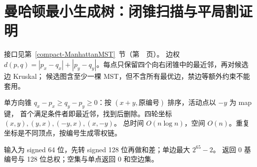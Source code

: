 \section{曼哈顿最小生成树：闭锥扫描与平局割证明}\label{knowledge-manhattan-mst}
接口见第~\ref{compact-ManhattanMST}~节（第~\pageref{compact-ManhattanMST}~页）。
边权 $d(p,q)=|p_x-q_x|+|p_y-q_y|$。每点只保留四个向右闭锥中的最近邻，再对候选边 Kruskal；
候选图含至少一棵 MST，但不含所有最优边，禁边等额外约束不能套用。

单方向锥 $q_x-p_x\ge q_y-p_y\ge0$：按 $(x+y,\text{原编号})$ 排序，活动点以 $-y$ 为 map 键，
首个满足条件者即最近邻，找到后删除。四轮坐标 $(x,y),(y,x),(-y,x),(x,-y)$。
总时间 $O(n\log n)$，空间 $O(n)$。重复坐标是不同顶点，按编号生成零权链。

输入为 signed 64 位，先转 signed 128 位再做和差；单边最大 $2^{65}-2$。
返回 0 基编号与 128 位总权；空集与单点返回 0 和空边集。
